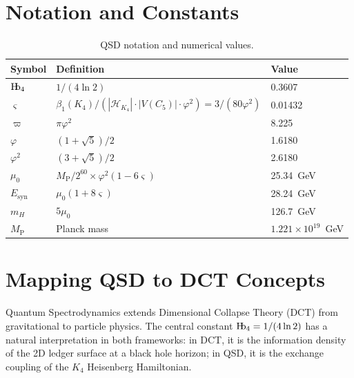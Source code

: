 \documentclass[11pt,a4paper]{article}
\theoremstyle{definition}
\newcommand{\Hb}{\textnormal{H\kern-0.3em b}}
\newcommand{\Hbfour}{\Hb_4}
\newcommand{\strain}{\varsigma}
\newcommand{\specbond}{\varpi}
\newcommand{\Esyn}{E_{\text{syn}}}
\newcommand{\Mpl}{M_{\mathrm{P}}}
\newcommand{\mH}{m_H}
\newcommand{\murad}{\mu_0}
\begin{document}
\section{Notation and Constants}
\label{app:notation}

\begin{table}[h]
\centering
\begin{tabular}{lll}
\toprule
\textbf{Symbol} & \textbf{Definition} & \textbf{Value} \\
\midrule
$\Hbfour$ & $1/(4\ln 2)$ & 0.3607 \\
$\strain$ & $\beta_1(K_4)/(|\mathcal{H}_{K_4}| \cdot |V(C_5)| \cdot \varphi^2) = 3/(80\varphi^2)$ & 0.01432 \\
$\specbond$ & $\pi\varphi^2$ & 8.225 \\
$\varphi$ & $(1+\sqrt{5})/2$ & 1.6180 \\
$\varphi^2$ & $(3+\sqrt{5})/2$ & 2.6180 \\
$\murad$ & $\Mpl / 2^{60} \times \varphi^2(1-6\strain)$ & 25.34~GeV \\
$\Esyn$ & $\murad(1+8\strain)$ & 28.24~GeV \\
$\mH$ & $5\murad$ & 126.7~GeV \\
$\Mpl$ & Planck mass & $1.221 \times 10^{19}$~GeV \\
\bottomrule
\end{tabular}
\caption{QSD notation and numerical values.}
\label{tab:notation}
\end{table}

\section{Mapping QSD to DCT Concepts}
\label{app:dct}

Quantum Spectrodynamics extends Dimensional Collapse Theory (DCT) \cite{Hubka2025DCT} from gravitational to particle physics. The central constant $\Hbfour = 1/(4\ln 2)$ has a natural interpretation in both frameworks: in DCT, it is the information density of the 2D ledger surface at a black hole horizon; in QSD, it is the exchange coupling of the $K_4$ Heisenberg Hamiltonian.
\end{document}
